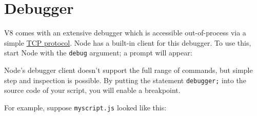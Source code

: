\section{Debugger}

\begin{Shaded}
\begin{Highlighting}[]
\NormalTok{: } 
\end{Highlighting}
\end{Shaded}

V8 comes with an extensive debugger which is accessible out-of-process
via a simple
\href{http://code.google.com/p/v8/wiki/DebuggerProtocol}{TCP protocol}.
Node has a built-in client for this debugger. To use this, start Node
with the \texttt{debug} argument; a prompt will appear:

\begin{Shaded}
\end{Shaded}

Node's debugger client doesn't support the full range of commands, but
simple step and inspection is possible. By putting the statement
\texttt{debugger;} into the source code of your script, you will enable
a breakpoint.

For example, suppose \texttt{myscript.js} looked like this:

\begin{Shaded}
\begin{Highlighting}[]
\NormalTok{;}
 \NormalTok{() \{}
  \NormalTok{(}\NormalTok{);}
\NormalTok{\}, }\NormalTok{);}
\NormalTok{(}\NormalTok{);}
\end{Highlighting}
\end{Shaded}

